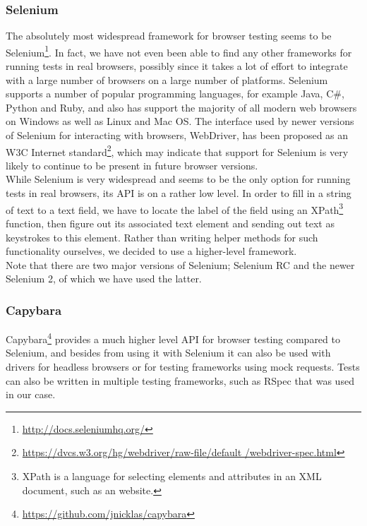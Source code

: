 
\subsubsection{Selenium}
The absolutely most widespread framework for browser testing seems to be
Selenium\footnote{\url{http://docs.seleniumhq.org/}}. In fact, we have
not even been able to find any other frameworks for running tests in
real browsers, possibly since it takes a lot of effort to integrate with
a large number of browsers on a large number of platforms. Selenium
supports a number of popular programming languages, for example Java,
C\#, Python and Ruby, and also has support the majority of all modern web
browsers on Windows as well as Linux and Mac OS. The interface used by
newer versions of Selenium for interacting with browsers, WebDriver, has
been proposed as an W3C Internet
standard\footnote{\url{https://dvcs.w3.org/hg/webdriver/raw-file/default
/webdriver-spec.html}}, which may indicate that support for Selenium
is very likely to continue to be present in future browser versions.
\cite{wiki:selenium}\\

While Selenium is very widespread and seems to be the only option for
running tests in real browsers, its API is on a rather low level. In
order to fill in a string of text to a text field, we have to locate the
label of the field using an XPath\footnote{XPath is a language for
selecting elements and attributes in an XML document, such as an
website.} function, then figure out its associated text element and
sending out text as keystrokes to this element. Rather than writing
helper methods for such functionality ourselves, we decided to use
a higher-level framework.\\

Note that there are two major versions of Selenium; Selenium RC
and the newer Selenium 2, of which we have used the latter.\\

\subsubsection{Capybara}
Capybara\footnote{\url{https://github.com/jnicklas/capybara}} provides a
much higher level API for browser testing compared to Selenium, and
besides from using it with Selenium it can also be used with drivers for
headless browsers or for testing frameworks using mock requests. Tests
can also be written in multiple testing frameworks, such as RSpec that
was used in our case.\\

